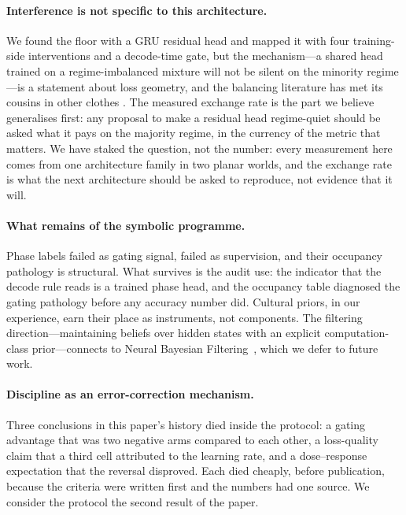 \documentclass{article}
\begin{document}
\paragraph{Interference is not specific to this architecture.} We found the floor with a GRU residual head and mapped it with four training-side interventions and a decode-time gate, but the mechanism---a shared head trained on a regime-imbalanced mixture will not be silent on the minority regime---is a statement about loss geometry, and the balancing literature has met its cousins in other clothes \citep{lyle2021,metabalance2022}. The measured exchange rate is the part we believe generalises first: any proposal to make a residual head regime-quiet should be asked what it pays on the majority regime, in the currency of the metric that matters. We have staked the question, not the number: every measurement here comes from one architecture family in two planar worlds, and the exchange rate is what the next architecture should be asked to reproduce, not evidence that it will.

\paragraph{What remains of the symbolic programme.} Phase labels failed as gating signal, failed as supervision, and their occupancy pathology is structural. What survives is the audit use: the indicator that the decode rule reads is a trained phase head, and the occupancy table diagnosed the gating pathology before any accuracy number did. Cultural priors, in our experience, earn their place as instruments, not components. The filtering direction---maintaining beliefs over hidden states with an explicit computation-class prior---connects to Neural Bayesian Filtering~\citep{nbf2025}, which we defer to future work.

\paragraph{Discipline as an error-correction mechanism.} Three conclusions in this paper's history died inside the protocol: a gating advantage that was two negative arms compared to each other, a loss-quality claim that a third cell attributed to the learning rate, and a dose--response expectation that the reversal disproved. Each died cheaply, before publication, because the criteria were written first and the numbers had one source. We consider the protocol the second result of the paper.
\end{document}
